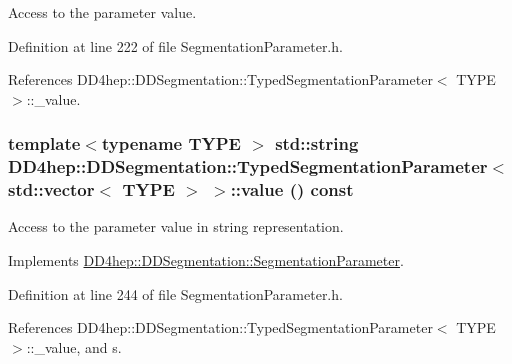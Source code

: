 Access to the parameter value. 

Definition at line 222 of file SegmentationParameter.h.

References DD4hep::DDSegmentation::TypedSegmentationParameter$<$ TYPE $>$::\_\-value.\hypertarget{class_d_d4hep_1_1_d_d_segmentation_1_1_typed_segmentation_parameter_3_01std_1_1vector_3_01_t_y_p_e_01_4_01_4_aec02d11d6f6bf666b67d22a76f70dafb}{
\subsubsection[{value}]{\setlength{\rightskip}{0pt plus 5cm}template$<$typename TYPE $>$ std::string {\bf DD4hep::DDSegmentation::TypedSegmentationParameter}$<$ std::vector$<$ TYPE $>$ $>$::value () const}}
\label{class_d_d4hep_1_1_d_d_segmentation_1_1_typed_segmentation_parameter_3_01std_1_1vector_3_01_t_y_p_e_01_4_01_4_aec02d11d6f6bf666b67d22a76f70dafb}


Access to the parameter value in string representation. 

Implements \hyperlink{class_d_d4hep_1_1_d_d_segmentation_1_1_segmentation_parameter_a633dffe9e53306c5f67568ff5e567387}{DD4hep::DDSegmentation::SegmentationParameter}.

Definition at line 244 of file SegmentationParameter.h.

References DD4hep::DDSegmentation::TypedSegmentationParameter$<$ TYPE $>$::\_\-value, and s.

